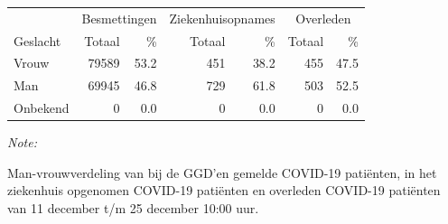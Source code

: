 \documentclass[
  english,
  man,floatsintext]{apa6}
\begin{document}
\begin{table}[H]
\centering\begingroup\fontsize{11}{13}\selectfont

\begin{threeparttable}
\begin{tabular}{lrrrrrr}
\toprule
\multicolumn{1}{c}{ } & \multicolumn{2}{c}{Besmettingen} & \multicolumn{2}{c}{Ziekenhuisopnames} & \multicolumn{2}{c}{Overleden} \\
\cmidrule(l{3pt}r{3pt}){2-3} \cmidrule(l{3pt}r{3pt}){4-5} \cmidrule(l{3pt}r{3pt}){6-7}
Geslacht & Totaal & \% & Totaal & \% & Totaal & \%\\
\midrule
Vrouw & 79589 & 53.2 & 451 & 38.2 & 455 & 47.5\\
Man & 69945 & 46.8 & 729 & 61.8 & 503 & 52.5\\
Onbekend & 0 & 0.0 & 0 & 0.0 & 0 & 0.0\\
\bottomrule
\end{tabular}
\begin{tablenotes}
\item \textit{Note: } 
\item Man-vrouwverdeling van bij de GGD’en gemelde COVID-19 patiënten, in het ziekenhuis opgenomen COVID-19 patiënten en overleden COVID-19 patiënten van 11 december t/m 25 december 10:00 uur.
\end{tablenotes}
\end{threeparttable}
\endgroup{}
\end{table}
\newpage
\end{document}
